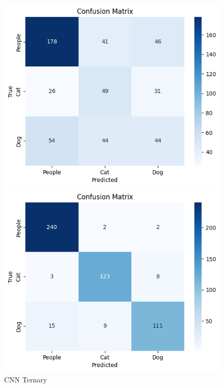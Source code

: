 \documentclass{article} %
\begin{document}
\begin{figure}[htbp]
  \centering
  \begin{minipage}{.3\textwidth}
    \centering
    \includegraphics[width=\linewidth]{./figure+object/CNN_ternary_BCE.png}
    \caption{CNN Ternary}
    \label{fig:cnn_cm_ter}
  \end{minipage}%
  \hfill
  \begin{minipage}{.3\textwidth}
    \centering
    \includegraphics[width=\linewidth]{./figure+object/resnet_ternary_BCE.png}

\end{minipage}
\end{figure}
\end{document}
